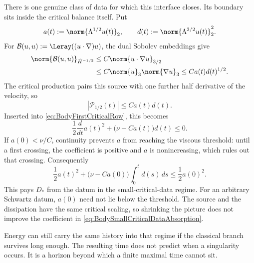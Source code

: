There is one genuine class of data for which this interface closes.  Its
boundary sits inside the critical balance itself.  Put
\[
  a(t):=\norm{\Lambda^{1/2}u(t)}_2,
  \qquad
  d(t):=\norm{\Lambda^{3/2}u(t)}_2^2.
\]
For
\(
  \mathcal B(u,u):=\Leray((u\cdot\nabla)u)
\), the dual Sobolev embeddings give
\begin{align}
  \norm{\mathcal B(u,u)}_{\dot H^{-1/2}}
  &\leq C\norm{u\cdot\nabla u}_{3/2}
  \notag\\
  &\leq C\norm{u}_3\norm{\nabla u}_3
  \leq C a(t)d(t)^{1/2}.
  \label{eq:BodyCriticalNonlinearDualEstimate}
\end{align}
The critical production pairs this source with one further half derivative of
the velocity, so
\begin{equation}\label{eq:BodyCriticalProductionAbsoluteEstimate}
  |\mathcal P_{1/2}(t)|
  \leq C a(t)d(t).
\end{equation}
Inserted into \eqref{eq:BodyFirstCriticalRow}, this becomes
\begin{equation}\label{eq:BodySmallCriticalDataAbsorption}
  \frac12\frac d{dt}a(t)^2
+\bigl(\nu-Ca(t)\bigr)d(t)
\leq0.
\end{equation}
If \(a(0)<\nu/C\), continuity prevents \(a\) from reaching the viscous
threshold: until a first crossing, the coefficient is positive and \(a\) is
nonincreasing, which rules out that crossing.  Consequently
\begin{equation}\label{eq:BodySmallCriticalDataDissipation}
  \frac12a(t)^2
+\bigl(\nu-Ca(0)\bigr)\int_0^t d(s)\,ds
\leq\frac12a(0)^2.
\end{equation}
This pays \(D_*\) from the datum in the small-critical-data regime.  For an
arbitrary Schwartz datum, \(a(0)\) need not lie below the threshold.  The source
and the dissipation have the same critical scaling, so shrinking the picture
does not improve the coefficient in
\eqref{eq:BodySmallCriticalDataAbsorption}.

Energy can still carry the same history into that regime if the classical
branch survives long enough.  The resulting time does not predict when a
singularity occurs.  It is a horizon beyond which a finite maximal time cannot
sit.


